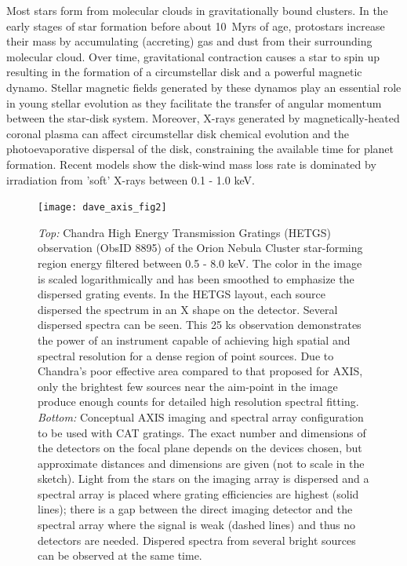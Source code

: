 \documentclass[12pt]{spieman}  %
\begin{document}
\begin{spacing}{1}
Most stars form from molecular clouds in gravitationally bound clusters.  In the early stages of star formation before about 10~Myrs of age, protostars increase their mass by accumulating (accreting) gas and dust from their surrounding molecular cloud. Over time, gravitational contraction causes a star to spin up resulting in the formation of a circumstellar disk\cite{2000ApJ...531..350M} and a powerful magnetic dynamo\cite{1984ApJ...279..763N}. Stellar magnetic fields generated by these dynamos play an essential role in young stellar evolution as they facilitate the transfer of angular momentum between the star-disk system\cite{2013A&A...556A..36G}. Moreover, X-rays generated by magnetically-heated coronal plasma can affect circumstellar disk chemical evolution \cite{2013ApJ...766....8A} and the photoevaporative dispersal of the disk\cite{2014prpl.conf..475A}, constraining the available time for planet formation. Recent models show the disk-wind mass loss rate is dominated by irradiation from 'soft' X-rays between 0.1 - 1.0 keV\cite{2021MNRAS.508.1675E}.

\begin{figure} [ht]
  \begin{center}
  \texttt{[image: dave\_axis\_fig2]}
  \end{center}
  \caption {\label{fig:science}
  \emph{Top:} Chandra High Energy Transmission Gratings (HETGS) observation (ObsID 8895)  of the Orion Nebula Cluster star-forming region energy filtered between 0.5 - 8.0 keV. The color in the image is scaled logarithmically and has been smoothed to emphasize the dispersed grating events. In the HETGS layout, each source dispersed the spectrum in an X shape on the detector. Several dispersed spectra can be seen. This 25 ks observation demonstrates the power of an instrument capable of achieving high spatial and spectral resolution for a dense region of point sources. Due to Chandra's poor effective area compared to that proposed for AXIS, only the brightest few sources near the aim-point in the image produce enough counts for detailed high resolution spectral fitting. \emph{Bottom:} Conceptual AXIS imaging and spectral array configuration to be used with CAT gratings. The exact number and dimensions of the detectors on the focal plane depends on the devices chosen, but approximate distances and dimensions are given (not to scale in the sketch). Light from the stars on the imaging array is dispersed and a spectral array is placed where grating efficiencies are highest (solid lines); there is a gap between the direct imaging detector and the spectral array where the signal is weak (dashed lines) and thus no detectors are needed. Dispered spectra from several bright sources can be observed at the same time.
  }
\end{figure}


\end{spacing}
\end{document}
